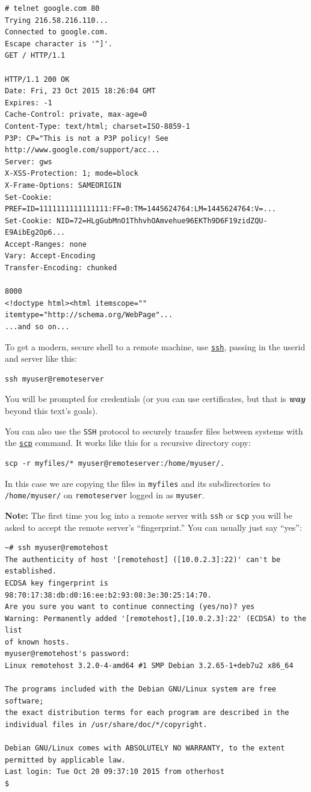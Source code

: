 \documentclass[10pt,]{book}
\numberwithin{figure}{chapter}
\begin{document}
\begin{verbatim}
# telnet google.com 80
Trying 216.58.216.110...
Connected to google.com.
Escape character is '^]'.
GET / HTTP/1.1

HTTP/1.1 200 OK
Date: Fri, 23 Oct 2015 18:26:04 GMT
Expires: -1
Cache-Control: private, max-age=0
Content-Type: text/html; charset=ISO-8859-1
P3P: CP="This is not a P3P policy! See http://www.google.com/support/acc...
Server: gws
X-XSS-Protection: 1; mode=block
X-Frame-Options: SAMEORIGIN
Set-Cookie: PREF=ID=1111111111111111:FF=0:TM=1445624764:LM=1445624764:V=...
Set-Cookie: NID=72=HLgGubMnO1ThhvhOAmvehue96EKTh9D6F19zidZQU-E9AibEg2Op6...
Accept-Ranges: none
Vary: Accept-Encoding
Transfer-Encoding: chunked

8000
<!doctype html><html itemscope="" itemtype="http://schema.org/WebPage"...
...and so on...
\end{verbatim}

To get a modern, secure shell to a remote machine, use
\href{http://linux.die.net/man/1/ssh}{\texttt{ssh}}, passing in the
userid and server like this:

\begin{verbatim}
ssh myuser@remoteserver
\end{verbatim}

You will be prompted for credentials (or you can use certificates, but
that is \textbf{\emph{way}} beyond this text's goals).

You can also use the \texttt{SSH} protocol to securely transfer files
between systems with the \href{linux.die.net/man/1/scp}{\texttt{scp}}
command. It works like this for a recursive directory copy:

\begin{verbatim}
scp -r myfiles/* myuser@remoteserver:/home/myuser/.
\end{verbatim}

In this case we are copying the files in \texttt{myfiles} and its
subdirectories to \texttt{/home/myuser/} on \texttt{remoteserver} logged
in as \texttt{myuser}.

\textbf{Note:} The first time you log into a remote server with
\texttt{ssh} or \texttt{scp} you will be asked to accept the remote
server's ``fingerprint.'' You can usually just say ``yes'':

\begin{verbatim}
~# ssh myuser@remotehost
The authenticity of host '[remotehost] ([10.0.2.3]:22)' can't be established.
ECDSA key fingerprint is 98:70:17:38:db:d0:16:ee:b2:93:08:3e:30:25:14:70.
Are you sure you want to continue connecting (yes/no)? yes
Warning: Permanently added '[remotehost],[10.0.2.3]:22' (ECDSA) to the list
of known hosts.
myuser@remotehost's password:
Linux remotehost 3.2.0-4-amd64 #1 SMP Debian 3.2.65-1+deb7u2 x86_64

The programs included with the Debian GNU/Linux system are free software;
the exact distribution terms for each program are described in the
individual files in /usr/share/doc/*/copyright.

Debian GNU/Linux comes with ABSOLUTELY NO WARRANTY, to the extent
permitted by applicable law.
Last login: Tue Oct 20 09:37:10 2015 from otherhost
$
\end{verbatim}
\end{document}
